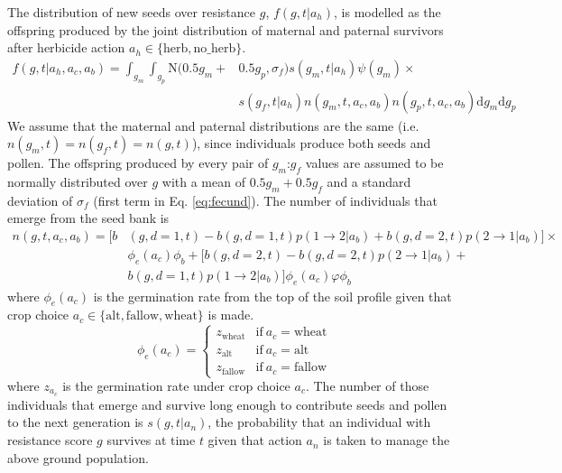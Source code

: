 \documentclass[12pt, a4paper]{article}
\begin{document}
The distribution of new seeds over resistance $g$, $f(g, t|a_h)$, is modelled as the offspring produced by the joint distribution of maternal and paternal survivors after herbicide action $a_h \in \{\text{herb}, \text{no\_herb}\}$.     
\begin{equation}
\label{eq:fecund}
\begin{split}
	f(g, t|a_h, a_c, a_b) = \displaystyle\int_{g_m}\int_{g_p} \text{N}(0.5 g_m + &0.5 g_p, \sigma_f)s(g_m, t|a_h)\psi(g_m)\times \\ 
		&s(g_f, t|a_h)n(g_m, t, a_c, a_b)n(g_p, t, a_c, a_b)\text{d}g_m\text{d}g_p 
\end{split}
\end{equation}
We assume that the maternal and paternal distributions are the same (i.e. $n(g_m, t) = n(g_f, t) = n(g, t)$), since individuals produce both seeds and pollen. The offspring produced by every pair of $g_m$:$g_f$ values are assumed to be normally distributed over $g$ with a mean of $0.5g_m + 0.5g_f$ and a standard deviation of $\sigma_f$ (first term in Eq. \ref{eq:fecund}). The number of individuals that emerge from the seed bank is
\begin{equation}\label{eq:above_ground}
\begin{split}
	n(g, t, a_c, a_b) = [b&(g, d = 1, t) - b(g, d = 1, t)p(1 \rightarrow 2|a_b) + b(g, d = 2, t)p(2 \rightarrow 1|a_b)] \times \\
	&\phi_e(a_c)\phi_b + [b(g, d = 2, t) - b(g, d = 2, t)p(2 \rightarrow 1|a_b) +\\ 
	&b(g, d = 1, t)p(1 \rightarrow 2|a_b)]\phi_e(a_c)\varphi\phi_b
\end{split}		
\end{equation}
where $\phi_e(a_c)$ is the germination rate from the top of the soil profile given that crop choice $a_c \in \{\text{alt}, \text{fallow}, \text{wheat}\}$ is made. 
\begin{equation}\label{eq:estab}
	\phi_e(a_c) = \begin{cases}
		z_\text{wheat}&\text{if}~a_c = \text{wheat}\\
		z_\text{alt}&\text{if}~a_c = \text{alt}\\
		z_\text{fallow}&\text{if}~a_c = \text{fallow}	
	\end{cases}
\end{equation}
where $z_{a_c}$ is the germination rate under crop choice $a_c$. The number of those individuals that emerge and survive long enough to contribute seeds and pollen to the next generation is $s(g, t|a_n)$, the probability that an individual with resistance score $g$ survives at time $t$ given that action $a_n$ is taken to manage the above ground population. 
\end{document}
